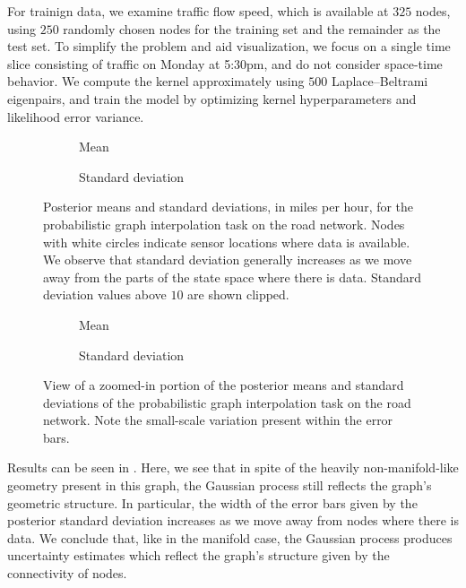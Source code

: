\documentclass[11pt]{book}
\begin{document}
For trainign data, we examine traffic flow speed, which is available at $325$ nodes, using $250$ randomly chosen nodes for the training set and the remainder as the test set.
To simplify the problem and aid visualization, we focus on a single time slice consisting of traffic on Monday at 5:30pm, and do not consider space-time behavior.
We compute the kernel approximately using $500$ Laplace--Beltrami eigenpairs, and train the model by optimizing kernel hyperparameters and likelihood error variance.

\begin{figure}
\begin{subfigure}{0.49\textwidth}

\caption{Mean}
\end{subfigure}
\begin{subfigure}{0.49\textwidth}

\caption{Standard deviation}
\end{subfigure}
\caption[Posterior Gaussian process: traffic data, global view]{Posterior means and standard deviations, in miles per hour, for the probabilistic graph interpolation task on the road network. Nodes with white circles indicate sensor locations where data is available. We observe that standard deviation generally increases as we move away from the parts of the state space where there is data. Standard deviation values above $10$ are shown clipped. }
\label{fig:graph-posterior}
\end{figure}

\begin{figure}
\begin{subfigure}{0.49\textwidth}

\caption{Mean}
\end{subfigure}
\begin{subfigure}{0.49\textwidth}

\caption{Standard deviation}
\end{subfigure}
\caption[Posterior Gaussian process: traffic data, local view]{View of a zoomed-in portion of the posterior means and standard deviations of the probabilistic graph interpolation task on the road network. Note the small-scale variation present within the error bars.}
\label{fig:graph-posterior-zoom}
\end{figure}



Results can be seen in .
Here, we see that in spite of the heavily non-manifold-like geometry present in this graph, the Gaussian process still reflects the graph's geometric structure.
In particular, the width of the error bars given by the posterior standard deviation increases as we move away from nodes where there is data.
We conclude that, like in the manifold case, the Gaussian process produces uncertainty estimates which reflect the graph's structure given by the connectivity of nodes.
\end{document}
